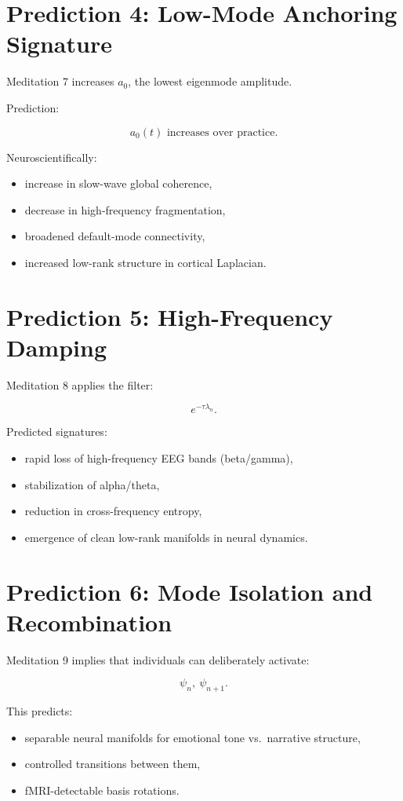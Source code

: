 \documentclass[12pt]{article}
\begin{document}
\section{Prediction 4: Low-Mode Anchoring Signature}

Meditation 7 increases $a_0$, the lowest eigenmode amplitude.

Prediction:

\[
a_0(t) \text{ increases over practice}.
\]

Neuroscientifically:

\begin{itemize}
\item increase in slow-wave global coherence,
\item decrease in high-frequency fragmentation,
\item broadened default-mode connectivity,
\item increased low-rank structure in cortical Laplacian.
\end{itemize}

\section{Prediction 5: High-Frequency Damping}

Meditation 8 applies the filter:

\[
e^{-\tau \lambda_n}.
\]

Predicted signatures:

\begin{itemize}
\item rapid loss of high-frequency EEG bands (beta/gamma),
\item stabilization of alpha/theta,
\item reduction in cross-frequency entropy,
\item emergence of clean low-rank manifolds in neural dynamics.
\end{itemize}

\section{Prediction 6: Mode Isolation and Recombination}

Meditation 9 implies that individuals can deliberately activate:

\[
\psi_n, \ \psi_{n+1}.
\]

This predicts:

\begin{itemize}
\item separable neural manifolds for emotional tone vs.\ narrative structure,
\item controlled transitions between them,
\item fMRI-detectable basis rotations.
\end{itemize}
\end{document}
